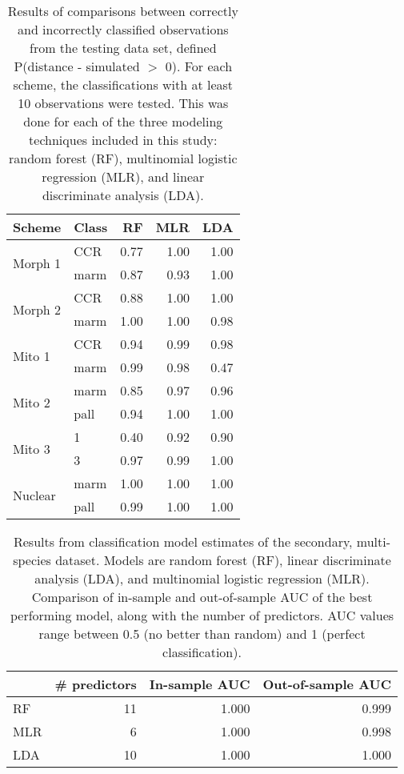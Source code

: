\documentclass{article}
\begin{document}
\begin{table}
  \centering
  \caption{Results of comparisons between correctly and incorrectly classified observations from the testing data set, defined P(distance - simulated \(>\) 0). For each scheme, the classifications with at least 10 observations were tested. This was done for each of the three modeling techniques included in this study: random forest (RF), multinomial logistic regression (MLR), and linear discriminate analysis (LDA).}
  \begin{tabular}{ l | l r r r }
    \hline
    Scheme & Class & RF & MLR & LDA \\
    \hline
    \hline
    \multirow{2}{*}{Morph 1} & CCR & 0.77 & 1.00 & 1.00 \\ 
    & marm & 0.87 & 0.93 & 1.00 \\ 
    \hline
    \multirow{2}{*}{Morph 2} & CCR & 0.88 & 1.00 & 1.00 \\ 
    & marm & 1.00 & 1.00 & 0.98 \\ 
    \hline
    \multirow{2}{*}{Mito 1} & CCR & 0.94 & 0.99 & 0.98 \\ 
    & marm & 0.99 & 0.98 & 0.47 \\ 
    \hline
    \multirow{2}{*}{Mito 2} & marm & 0.85 & 0.97 & 0.96 \\ 
    & pall & 0.94 & 1.00 & 1.00 \\ 
    \hline
    \multirow{2}{*}{Mito 3} & 1 & 0.40 & 0.92 & 0.90 \\ 
    & 3 & 0.97 & 0.99 & 1.00 \\ 
    \hline
    \multirow{2}{*}{Nuclear} & marm & 1.00 & 1.00 & 1.00 \\ 
    & pall & 0.99 & 1.00 & 1.00 \\ 
    \hline
  \end{tabular}
  \label{tab:miss_tests}
\end{table}

\begin{table}[ht]
  \centering
  \caption{Results from classification model estimates of the secondary, multi-species dataset. Models are random forest (RF), linear discriminate analysis (LDA), and multinomial logistic regression (MLR). Comparison of in-sample and out-of-sample AUC of the best performing model, along with the number of predictors. AUC values range between 0.5 (no better than random) and 1 (perfect classification).}
  \begin{tabular}{ l r r r }
    \hline
    & \# predictors & In-sample AUC & Out-of-sample AUC \\ 
    \hline
    \hline
    RF &   11 & 1.000 & 0.999 \\ 
    MLR &    6 & 1.000 & 0.998 \\ 
    LDA &   10 & 1.000 & 1.000 \\ 
    \hline
  \end{tabular}
  \label{tab:second_res}
\end{table}
\end{document}
